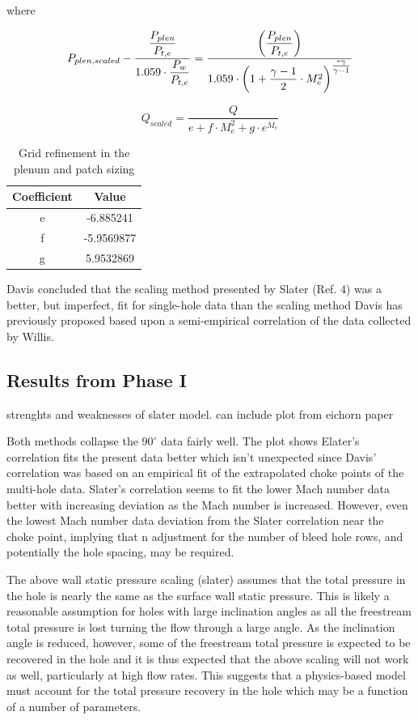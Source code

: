\documentclass{article}
\newcommand{\minus}{\texttt{-}}
\newcommand{\sfrac}[2]{\textstyle\frac{#1}{#2}}
\begin{document}
where 

$$ P_{plen,scaled} - \frac{\dfrac{P_{plen}}{P_{t,e}}}{1.059\cdot\dfrac{P_w}{P_{t,e}}} = \dfrac{\qty(\dfrac{P_{plen}}{P_{t,e}})}{1.059 \cdot \qty(1+\dfrac{\gamma-1}{2}\cdot M^2_e)^{\sfrac{\minus\gamma}{\gamma-1}}} $$

$$ Q_{scaled} = \dfrac{Q}{e + f\cdot M_e^2 + g \cdot e^{M_e}} $$

\begin{table}[!htbp] \centering 
\begin{tabular}[c]{*{2}{|c}|} \hline
\textbf{Coefficient} & \textbf{Value}   \\ \hline
e   & -6.885241  \\ \hline
f   & -5.9569877 \\ \hline
g   &  5.9532869 \\ \hline
\end{tabular} 
\caption{Grid refinement in the plenum and patch sizing} 
\label{tab:davis2} \end{table}

Davis \cite{Davis2012} concluded that the scaling method presented by Slater (Ref. 4) was a better, but imperfect, fit for single-hole data than the scaling method Davis has previously proposed based upon a semi-empirical correlation of the data collected by Willis.

\subsection{Results from Phase I}
strenghts and weaknesses of slater model. can include plot from eichorn paper

Both methods collapse the $90^\circ$ data fairly well. The plot shows Elater's correlation fits the present data better which isn't unexpected since Davis' correlation was based on an empirical fit of the extrapolated choke points of the multi-hole data. Slater's correlation seems to fit the lower Mach number data better with increasing deviation as the Mach number is increased. However, even the lowest Mach number data deviation from the Slater correlation near the choke point, implying that n adjustment for the number of bleed hole rows, and potentially the hole spacing, may be required.

The above wall static pressure scaling (slater) assumes that the total pressure in the hole is nearly the same as the surface wall static pressure. This is likely a reasonable assumption for holes with large inclination angles as all the freestream total pressure is lost turning the flow through a large angle. As the inclination angle is reduced, however, some of the freestream total pressure is expected to be recovered in the hole and it is thus expected that the above scaling will not work as well, particularly at high flow rates. This suggests that a physics-based model must account for the total pressure recovery in the hole which may be a function of a number of parameters.
\end{document}
